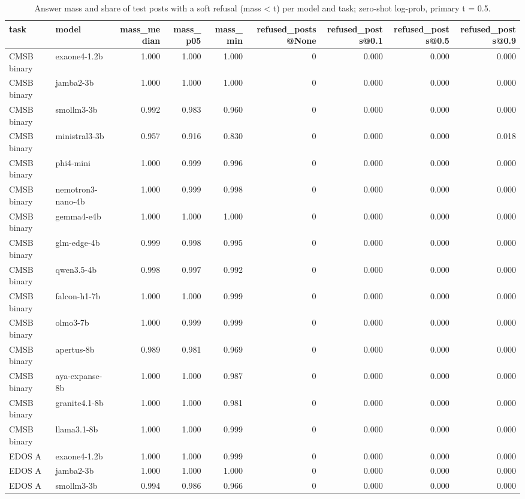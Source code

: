 \begin{table}[t]
\caption{Answer mass and share of test posts with a soft refusal (mass < t) per model and task; zero-shot log-prob, primary t = 0.5.}
\label{tab:mass_refusal}
\begin{tabular}{llrrrrrrr}
\toprule
task & model & mass_median & mass_p05 & mass_min & refused_posts@None & refused_posts@0.1 & refused_posts@0.5 & refused_posts@0.9 \\
\midrule
CMSB binary & exaone4-1.2b & 1.000 & 1.000 & 1.000 & 0 & 0.000 & 0.000 & 0.000 \\
CMSB binary & jamba2-3b & 1.000 & 1.000 & 1.000 & 0 & 0.000 & 0.000 & 0.000 \\
CMSB binary & smollm3-3b & 0.992 & 0.983 & 0.960 & 0 & 0.000 & 0.000 & 0.000 \\
CMSB binary & ministral3-3b & 0.957 & 0.916 & 0.830 & 0 & 0.000 & 0.000 & 0.018 \\
CMSB binary & phi4-mini & 1.000 & 0.999 & 0.996 & 0 & 0.000 & 0.000 & 0.000 \\
CMSB binary & nemotron3-nano-4b & 1.000 & 0.999 & 0.998 & 0 & 0.000 & 0.000 & 0.000 \\
CMSB binary & gemma4-e4b & 1.000 & 1.000 & 1.000 & 0 & 0.000 & 0.000 & 0.000 \\
CMSB binary & glm-edge-4b & 0.999 & 0.998 & 0.995 & 0 & 0.000 & 0.000 & 0.000 \\
CMSB binary & qwen3.5-4b & 0.998 & 0.997 & 0.992 & 0 & 0.000 & 0.000 & 0.000 \\
CMSB binary & falcon-h1-7b & 1.000 & 1.000 & 0.999 & 0 & 0.000 & 0.000 & 0.000 \\
CMSB binary & olmo3-7b & 1.000 & 0.999 & 0.999 & 0 & 0.000 & 0.000 & 0.000 \\
CMSB binary & apertus-8b & 0.989 & 0.981 & 0.969 & 0 & 0.000 & 0.000 & 0.000 \\
CMSB binary & aya-expanse-8b & 1.000 & 1.000 & 0.987 & 0 & 0.000 & 0.000 & 0.000 \\
CMSB binary & granite4.1-8b & 1.000 & 1.000 & 0.981 & 0 & 0.000 & 0.000 & 0.000 \\
CMSB binary & llama3.1-8b & 1.000 & 1.000 & 0.999 & 0 & 0.000 & 0.000 & 0.000 \\
EDOS A & exaone4-1.2b & 1.000 & 1.000 & 0.999 & 0 & 0.000 & 0.000 & 0.000 \\
EDOS A & jamba2-3b & 1.000 & 1.000 & 1.000 & 0 & 0.000 & 0.000 & 0.000 \\
EDOS A & smollm3-3b & 0.994 & 0.986 & 0.966 & 0 & 0.000 & 0.000 & 0.000 \\

\end{tabular}
\end{table}
